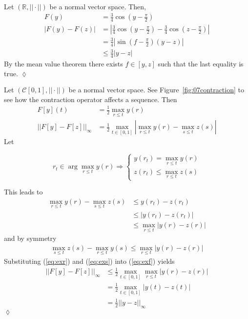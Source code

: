 \begin{example}
Let $(\mathbb{R},||\cdot||)$ be a normal vector space.
Then,
\begin{align*}
F(y) &= \frac{3}{4}\cos(y-\frac{\pi}{2}) \\
|F(y)-F(z)| &= \left|\frac{3}{4}\cos(y-\frac{\pi}{2})-\frac{3}{4}\cos(z-\frac{\pi}{2})\right| \\
&= \frac{3}{4}\left|\sin(f-\frac{\pi}{2})(y-z)\right| \\
&\leq \frac{3}{4}|y-z|
\end{align*}
By the mean value theorem there exists $f\in[y,z]$ such that the last equality is true.
$\lozenge$
\end{example}

\begin{example}
Let $(\mathcal{C}[0,1],||\cdot||)$ be a normal vector space.
See Figure~\ref{fig:07contraction} to see how the contraction operator affects a sequence.
Then
\begin{align}
\label{eq:exf}
F[y](t) &= \frac{1}{2}\max_{r\leq t}y(r) \nonumber \\
||F[y]-F[z]||_\infty &= \frac{1}{2}\max_{t\in[0,1]}|\max_{r\leq t}y(r)-\max_{s\leq t}z(s)|
\end{align}
Let

\begin{equation*}
r_t\in\arg\max_{r\leq t}y(r) \Rightarrow \begin{cases} y(r_t) = \max_{r\leq t}y(r) \\ z(r_t)\leq\max_{r\leq t}z(s) \end{cases}
\end{equation*}

This leads to
\begin{align}
\label{eq:exr}
\max_{r\leq t}y(r)-\max_{s\leq t}z(s) &\leq y(r_t)-z(r_t) \nonumber \\
&\leq |y(r_t)-z(r_t)| \nonumber \\
&\leq \max_{r\leq t}|y(r)-z(r)|
\end{align}
and by symmetry
\begin{align}
\label{eq:exs}
\max_{s\leq t}z(s)-\max_{r\leq t}y(s) \leq \max_{r\leq t}|y(r)-z(r)|
\end{align}
Substituting (\ref{eq:exr}) and (\ref{eq:exs}) into (\ref{eq:exf}) yields
\begin{align*}
||F[y]-F[z]||_\infty &\leq \frac{1}{2}\max_{t\in[0,1]}\max_{r\leq t}|y(r)-z(r)| \\
&= \frac{1}{2}\max_{t\in[0,1]}|y(t)-z(t)| \\
&= \frac{1}{2}||y-z||_\infty
\end{align*}
$\lozenge$
\end{example}

